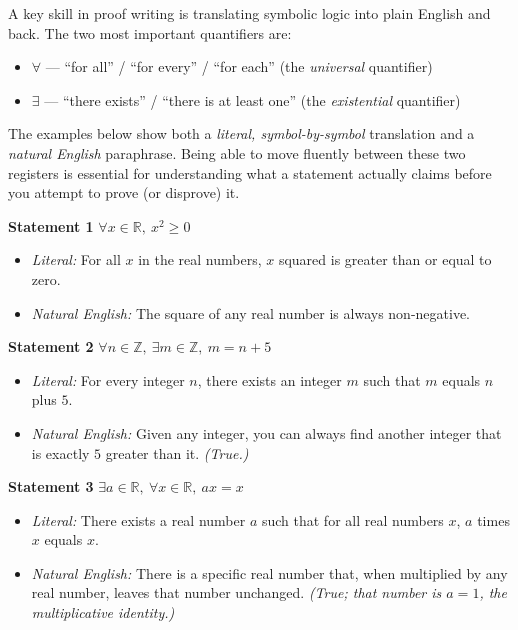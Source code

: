 \documentclass[12pt]{article}
\begin{document}
A key skill in proof writing is translating symbolic logic into plain English and back. The two most important quantifiers are:
\begin{itemize}
  \item $\forall$ --- ``for all'' / ``for every'' / ``for each'' (the \textit{universal} quantifier)
  \item $\exists$ --- ``there exists'' / ``there is at least one'' (the \textit{existential} quantifier)
\end{itemize}

The examples below show both a \textit{literal, symbol-by-symbol} translation and a \textit{natural English} paraphrase. Being able to move fluently between these two registers is essential for understanding what a statement actually claims before you attempt to prove (or disprove) it.

\medskip

\noindent\textbf{Statement 1} \quad $\forall x \in \mathbb{R},\ x^2 \ge 0$

\begin{itemize}
  \item \textit{Literal:} For all $x$ in the real numbers, $x$ squared is greater than or equal to zero.
  \item \textit{Natural English:} The square of any real number is always non-negative.
\end{itemize}

\medskip

\noindent\textbf{Statement 2} \quad $\forall n \in \mathbb{Z},\ \exists m \in \mathbb{Z},\ m = n + 5$

\begin{itemize}
  \item \textit{Literal:} For every integer $n$, there exists an integer $m$ such that $m$ equals $n$ plus $5$.
  \item \textit{Natural English:} Given any integer, you can always find another integer that is exactly $5$ greater than it. \emph{(True.)}
\end{itemize}

\medskip

\noindent\textbf{Statement 3} \quad $\exists a \in \mathbb{R},\ \forall x \in \mathbb{R},\ ax = x$

\begin{itemize}
  \item \textit{Literal:} There exists a real number $a$ such that for all real numbers $x$, $a$ times $x$ equals $x$.
  \item \textit{Natural English:} There is a specific real number that, when multiplied by any real number, leaves that number unchanged. \emph{(True; that number is $a = 1$, the multiplicative identity.)}
\end{itemize}
\end{document}
